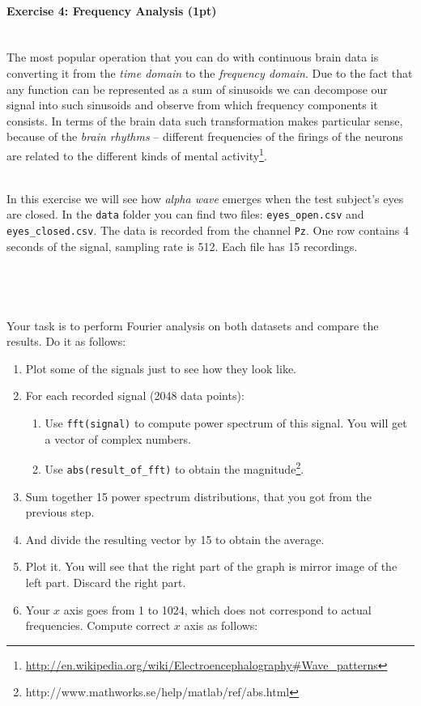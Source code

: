\documentclass[a4paper,11pt]{article}
\newenvironment{exercise}[3]{\paragraph{Exercise #1: #2 (#3pt)}\ \\}{
\medskip}
\begin{document}
%
%
\begin{exercise}{4}{Frequency Analysis}{1}
The most popular operation that you can do with continuous brain data is converting it from the \emph{time domain} to the \emph{frequency domain}. Due to the fact that any function can be represented as a sum of sinusoids we can decompose our signal into such sinusoids and observe from which frequency components it consists. In terms of the brain data such transformation makes particular sense, because of the \emph{brain rhythms} -- different frequencies of the firings of the neurons are related to the different kinds of mental activity\footnote{\url{http://en.wikipedia.org/wiki/Electroencephalography\#Wave_patterns}}.

\ \\
In this exercise we will see how \emph{alpha wave} emerges when the test subject's eyes are closed. In the \texttt{data} folder you can find two files: \texttt{eyes\_open.csv} and \texttt{eyes\_closed.csv}. The data is recorded from the channel \texttt{Pz}. One row contains 4 seconds of the signal, sampling rate is 512. Each file has 15 recordings.
\ \\
\ \\
\ \\
\ \\
\ \\
Your task is to perform Fourier analysis on both datasets and compare the results. Do it as follows:
\begin{enumerate}
	\item Plot some of the signals just to see how they look like.
	\item For each recorded signal (2048 data points):
		\begin{enumerate}
			\item Use \texttt{fft(signal)} to compute power spectrum of this signal. You will get a vector of complex numbers.
			\item Use \texttt{abs(result\_of\_fft)} to obtain the magnitude\footnote{http://www.mathworks.se/help/matlab/ref/abs.html}.
		\end{enumerate}
	\item Sum together 15 power spectrum distributions, that you got from the previous step.
	\item And divide the resulting vector by 15 to obtain the average.
	\item Plot it. You will see that the right part of the graph is mirror image of the left part. Discard the right part.
	\item Your $x$ axis goes from 1 to 1024, which does not correspond to actual frequencies. Compute correct $x$ axis as follows:

\end{enumerate}
\end{exercise}
\end{document}

